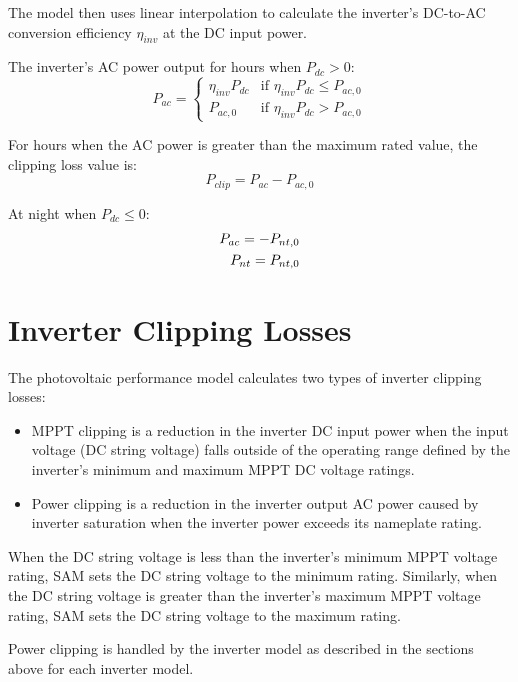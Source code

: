 \documentclass[12pt,letterpaper]{article}
\begin{document}
The model then uses linear interpolation to calculate the inverter's DC-to-AC conversion efficiency $\eta_{inv}$ at the DC input power.

The inverter's AC power output for hours when $P_{dc}>0$:
\begin{equation}
P_{ac} = \left\{
\begin{array}{ll}
\eta_{inv} P_{dc} & \text{if $\eta_{inv} P_{dc} \leq P_{ac,0}$}\\
P_{ac,0} & \text{if $\eta_{inv} P_{dc} > P_{ac,0}$} 
\end{array}\right.
\end{equation}

For hours when the AC power is greater than the maximum rated value, the clipping loss value is:
\begin{equation}
P_{clip} = P_{ac} - P_{ac,0}
\end{equation}

At night when $P_{dc} \leq 0$:
\begin{align}
P_{ac} = -P_{nt,0} \notag\\
P_{nt} = P_{nt,0}
\end{align}

\section{Inverter Clipping Losses}\label{sec-invclip}

The photovoltaic performance model calculates two types of inverter clipping losses:

\begin{itemize}
\item MPPT clipping is a reduction in the inverter DC input power when the input voltage (DC string voltage) falls outside of the operating range defined by the inverter's minimum and maximum MPPT DC voltage ratings.
\item Power clipping is a reduction in the inverter output AC power caused by inverter saturation when the inverter power exceeds its nameplate rating.
\end{itemize}

When the DC string voltage is less than the inverter's minimum MPPT voltage rating, SAM sets the DC string voltage to the minimum rating. Similarly, when the DC string voltage is greater than the inverter's maximum MPPT voltage rating, SAM sets the DC string voltage to the maximum rating.

Power clipping is handled by the inverter model as described in the sections above for each inverter model.
\end{document}
